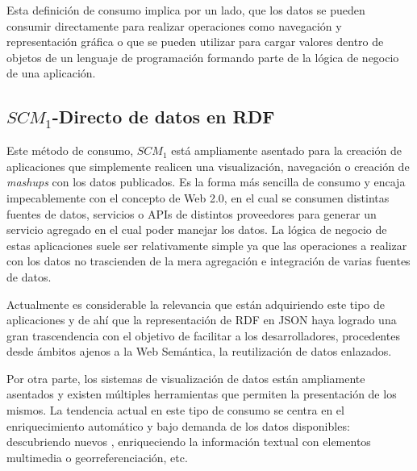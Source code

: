 Esta definición de consumo implica por un lado, que los datos se pueden consumir directamente para realizar operaciones
como navegación y representación gráfica o que se pueden utilizar para cargar valores dentro de objetos
de un lenguaje de programación formando parte de la lógica de negocio de una aplicación.

\subsection{$SCM_1$-Directo de datos en RDF}
Este método de consumo, $SCM_1$ está ampliamente asentado para la creación de aplicaciones
que simplemente realicen una visualización, navegación o creación de \textit{mashups} con los
datos publicados. Es la forma más sencilla de consumo y encaja impecablemente con el concepto
de Web 2.0, en el cual se consumen distintas fuentes de datos, servicios o APIs de distintos
proveedores para generar un servicio agregado en el cual poder manejar los datos. La lógica
de negocio de estas aplicaciones suele ser relativamente simple ya que las operaciones a realizar
con los datos no trascienden de la mera agregación e integración de varias fuentes de datos.

Actualmente es considerable la relevancia que están adquiriendo este tipo de aplicaciones y de ahí que la representación 
de \gls{RDF} en \gls{JSON} haya logrado una gran trascendencia con el objetivo de facilitar a los desarrolladores, procedentes desde ámbitos ajenos a la Web Semántica, 
la reutilización de datos enlazados.

Por otra parte, los sistemas de visualización de datos están ampliamente asentados y existen
múltiples herramientas que permiten la presentación de los mismos. La tendencia actual en este
tipo de consumo se centra en el enriquecimiento automático y bajo demanda de los datos disponibles: descubriendo
nuevos \datasets, enriqueciendo la información textual con elementos multimedia o georreferenciación, etc.


